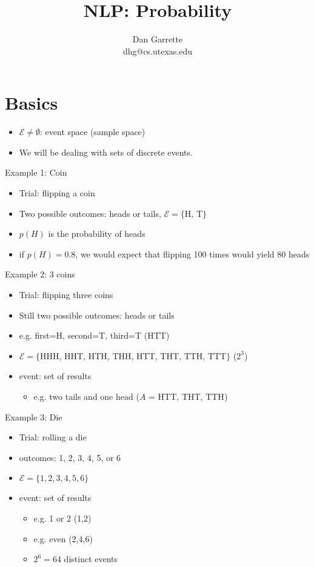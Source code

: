 \documentclass[11pt,letterpaper]{article}
\title{NLP: Probability}
\author{Dan Garrette\\\small{dhg@cs.utexas.edu}}
\begin{document}
\maketitle



\section{Basics}

\begin{itemize}
  \item $\mathcal{E} \neq \emptyset$: event space (sample space)
  \item We will be dealing with sets of discrete events.
\end{itemize}

Example 1: Coin

\begin{itemize}
  \item Trial: flipping a coin
  \item Two possible outcomes: heads or tails, $\mathcal{E} = \{$H, T$\}$
  \item $p(H)$ is the probability of heads
  \item if $p(H)=0.8$, we would expect that flipping 100 times would yield 80 heads
\end{itemize}

Example 2: 3 coins

\begin{itemize}
  \item Trial: flipping three coins
  \item Still two possible outcomes: heads or tails
  \item e.g. first=H, second=T, third=T (HTT)
  \item $\mathcal{E} = \{$HHH, HHT, HTH, THH, HTT, THT, TTH, TTT$\}$ ($2^3$)
  \item event: set of results
  \begin{itemize}
    \item e.g. two tails and one head ($A$ = {HTT, THT, TTH})
  \end{itemize}
\end{itemize}

Example 3: Die

\begin{itemize}
  \item Trial: rolling a die
  \item outcomes: 1, 2, 3, 4, 5, or 6
  \item $\mathcal{E} = \{ 1,2,3,4,5,6 \}$
  \item event: set of results
  \begin{itemize}
    \item e.g. 1 or 2 ({1,2})
    \item e.g. even ({2,4,6})
    \item $2^6 = 64$ distinct events
  \end{itemize}
\end{itemize}
\end{document}

